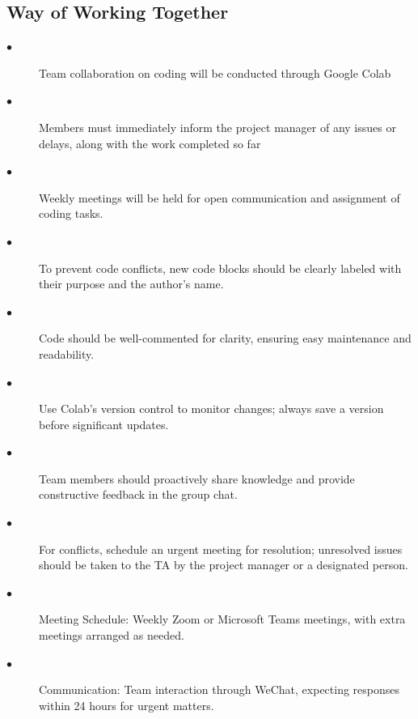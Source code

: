 \documentclass{article} %
\begin{document}
\subsection{Way of Working Together}
\begin{description}
  \item[$\bullet$]Team collaboration on coding will be conducted through Google Colab
  \item[$\bullet$]Members must immediately inform the project manager of any issues or delays, along with the work completed so far
  \item[$\bullet$]Weekly meetings will be held for open communication and assignment of coding tasks.
  \item[$\bullet$]To prevent code conflicts, new code blocks should be clearly labeled with their purpose and the author's name.
  \item[$\bullet$]Code should be well-commented for clarity, ensuring easy maintenance and readability.
  \item[$\bullet$]Use Colab's version control to monitor changes; always save a version before significant updates.
  \item[$\bullet$]Team members should proactively share knowledge and provide constructive feedback in the group chat.
  \item[$\bullet$]For conflicts, schedule an urgent meeting for resolution; unresolved issues should be taken to the TA by the project manager or a designated person.
  \item[$\bullet$]Meeting Schedule: Weekly Zoom or Microsoft Teams meetings, with extra meetings arranged as needed.
  \item[$\bullet$]Communication: Team interaction through WeChat, expecting responses within 24 hours for urgent matters.
\end{description}
\end{document}
